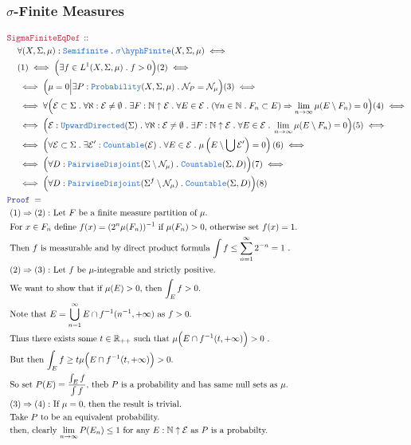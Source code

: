 \documentclass[12pt]{scrartcl}
\newcommand{\TYPE}[1]{\textcolor{NavyBlue}{\mathtt{#1}}}
\newcommand{\LOGIC}[1]{\textcolor{Blue}{\mathtt{#1}}}
\newcommand{\THM}[1]{\textcolor{Maroon}{\mathtt{#1}}}
\renewcommand{\.}{\; . \;}
\newcommand{\Theorem}[2]{& \THM{#1} \, :: \, #2 \\ & \Proof = \\ }
\newcommand{\NewLine}{\\ & \kern 1pc}
\newcommand{\Page}[1]{ \begin{align*} #1 \end{align*}   }
\newcommand{\Imply}{\Rightarrow}
\newcommand{\Reals}{\mathbb{R} }
\newcommand{\Nat}{\mathbb{N} }
\newcommand{\Proof}{\LOGIC{Proof} \; }
\newcommand{\Explain}[1]{& \text{#1.} \\}
\newcommand{\ExplainFurther}[1]{& \text{#1} \\}
\newcommand{\Countable}{\TYPE{Countable}}
\newcommand{\Null}{\mathcal{N}}
\newcommand{\Probability}{\TYPE{Probability}}
\newcommand{\sFinite}{\TYPE{\sigma \hyph  Finite}}
\newcommand{\Semifinite}{\TYPE{Semifinite}}
\newcommand{\E}{\mathcal{E}}
\begin{document}
\subsubsection{$\sigma$-Finite Measures}
\Page{
	\Theorem{SigmaFiniteEqDef}
	{
		\NewLine		
		\forall (X,\Sigma,\mu) : \Semifinite \.
		\sFinite(X,\Sigma,\mu)
		\iff \NewLine (1)\iff
		\Big(\exists f \in L^1(X,\Sigma,\mu) \. f > 0 \Big)
		(2)\iff \NewLine \iff
		\Big(\mu=0\Big|\exists P : \Probability(X,\Sigma,\mu) \. \Null_P = \Null_\mu \Big) 
		(3)\iff \NewLine \iff
		\forall 
			\Big(
				\E \subset \Sigma \. 
				\forall \aleph : \E \neq \emptyset \.
				\exists F : \Nat \uparrow \E \.
				\forall E \in \E \.
				(\forall n \in \Nat \. F_n \subset E)
				\Imply  \lim_{n \to \infty} \mu(E \setminus F_n) = 0 
			\Big)
		(4)\iff \NewLine \iff
		\Big(
				\E : \TYPE{UpwardDirected}(\Sigma) \. 
				\forall \aleph : \E \neq \emptyset \.
				\exists F : \Nat \uparrow \E \.
				\forall E \in \E \.
				\lim_{n \to \infty} \mu(E \setminus F_n) = 0 
			\Big)
		(5)\iff \NewLine \iff
		\left(
			\forall \E \subset \Sigma \.
			\exists \E' : \Countable(\E) \.
			\forall E \in \E \.
			\mu\left( E \setminus \bigcup \E' \right) = 0
		\right)
		(6)\iff \NewLine \iff
		\Big(
			\forall D : \TYPE{PairwiseDisjoint}(\Sigma \setminus \Null_\mu) \.
			\Countable(\Sigma, D) 
		\Big)
		(7)\iff \NewLine \iff
		\Big(
			\forall D : \TYPE{PairwiseDisjoint}(\Sigma^f \setminus \Null_\mu) \.
			\Countable(\Sigma, D) 
		\Big)(8)
	}
	\Explain{
		$(1) \Imply (2):$  Let $F$ be a finite measure partition of $\mu$}
	\Explain{
		For $x \in F_n$ define $f(x) = (2^n\mu(F_n))^{-1}$ if $\mu(F_n) > 0$, 
		otherwise set $f(x) = 1$}
	\Explain{
		Then $f$ is measurable and by direct product formula 
		$\int f \le \sum^\infty_{n=1} 2^{-n} = 1$	
	}
	\Explain{
		$(2) \Imply (3):$	Let $f$ be $\mu$-integrable and strictly positive}
	\Explain{
		We want to show that if $\mu(E) > 0$, then $\int_E f > 0$}
	\Explain{
		Note that $E =  \bigcup^\infty_{n=1} E \cap f^{-1}(n^{-1},+\infty)$ as $f>0$}
	\Explain{
		Thus there exists some $t \in \Reals_{++}$ such that 
		$\mu\Big( E \cap f^{-1}(t,+\infty)\Big) > 0$ }
	\Explain{
		But then
		$ \int_E f \ge  t \mu\Big( E \cap f^{-1}(t,+\infty)\Big) > 0 $}
	\Explain{
		So set $P(E) = \frac{\int_E f}{\int f}$, theb $P$ is a probability and has same null sets as $\mu$}
	\Explain{
		$(3) \Imply (4):$ If $\mu=0$, then the result is trivial}
	\Explain{
		Take $P$ to be an equivalent probability}
	\Explain{
		then, clearly $\lim_{n \to \infty} P(E_n) \le 1$ for any $E:\Nat \uparrow \E$ as $P$ is a probabilty}
	\ExplainFurther{
}}
\end{document}
